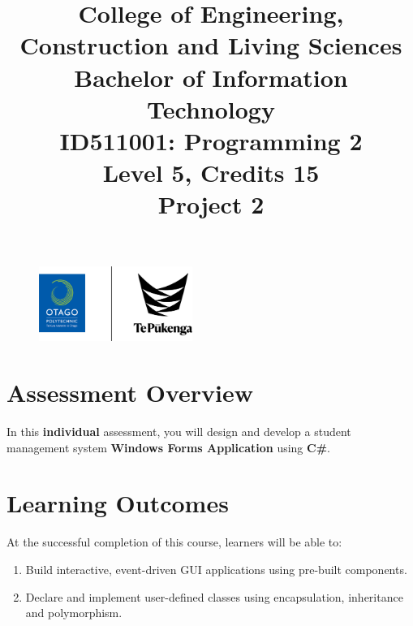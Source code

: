 \documentclass{article}
\author{}
\begin{document}
\begin{figure}
    \centering
    \includegraphics[width=50mm]{../../resources/img/logo.png}
\end{figure}

\title{College of Engineering, Construction and Living Sciences\\Bachelor of Information Technology\\ID511001: Programming 2\\Level 5, Credits 15\\\textbf{Project 2}}
\date{}
\maketitle

\section*{Assessment Overview}
In this \textbf{individual} assessment, you will design and develop a student management system \textbf{Windows Forms Application} using \textbf{C\#}. 

\section*{Learning Outcomes}
At the successful completion of this course, learners will be able to:
\begin{enumerate}
    \item Build interactive, event-driven GUI applications using pre-built components.
    \item Declare and implement user-defined classes using encapsulation, inheritance and polymorphism.
\end{enumerate}
\end{document}

